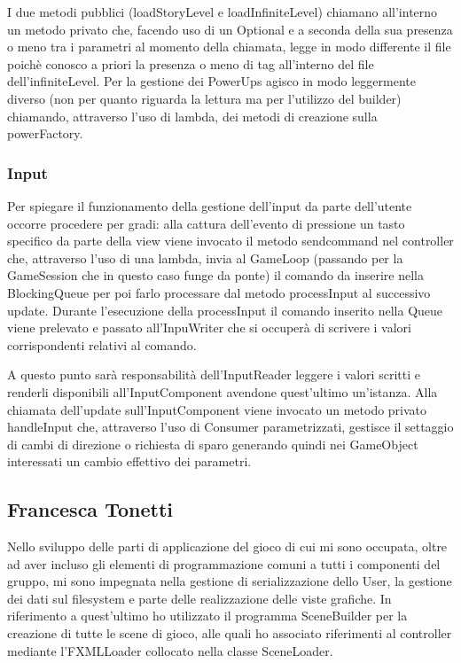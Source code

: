 \documentclass[a4paper,12pt]{report}
\begin{document}
I due metodi pubblici (loadStoryLevel e loadInfiniteLevel) chiamano all'interno un metodo privato che, facendo uso di un Optional e a seconda della sua presenza o meno tra i parametri al momento della chiamata, legge in modo differente il file poichè conosco a priori la presenza o meno di tag all'interno del file dell'infiniteLevel.
Per la gestione dei PowerUps agisco in modo leggermente diverso (non per quanto riguarda la lettura ma per l'utilizzo del builder) chiamando, attraverso l'uso di lambda, dei metodi di creazione sulla powerFactory.

\subsubsection*{Input}
Per spiegare il funzionamento della gestione dell'input da parte dell'utente occorre procedere per gradi: alla cattura dell'evento di pressione un tasto specifico da parte della view viene invocato il metodo sendcommand nel controller che, attraverso l'uso di una lambda, invia al GameLoop (passando per la GameSession che in questo caso funge da ponte) il comando da inserire nella BlockingQueue per poi farlo processare dal metodo processInput al successivo update.
Durante l'esecuzione della processInput il comando inserito nella Queue viene prelevato e passato all'InpuWriter che si occuperà di scrivere i valori corrispondenti relativi al comando.

A questo punto sarà responsabilità dell'InputReader leggere i valori scritti e renderli disponibili all'InputComponent avendone quest'ultimo un'istanza.
Alla chiamata dell'update sull'InputComponent viene invocato un metodo privato handleInput che, attraverso l'uso di Consumer parametrizzati, gestisce il settaggio di cambi di direzione o richiesta di sparo generando quindi nei GameObject interessati un cambio effettivo dei parametri.





\subsection*{Francesca Tonetti}
Nello sviluppo delle parti di applicazione del gioco di cui mi sono occupata, oltre ad aver incluso gli elementi di programmazione comuni a tutti i componenti del gruppo, mi sono impegnata nella gestione di serializzazione dello User, la gestione dei dati sul filesystem e parte delle realizzazione delle viste grafiche.
In riferimento a quest'ultimo ho utilizzato il programma SceneBuilder per la creazione di tutte le scene di gioco, alle quali ho associato riferimenti al controller mediante l'FXMLLoader collocato nella classe SceneLoader.
\end{document}
